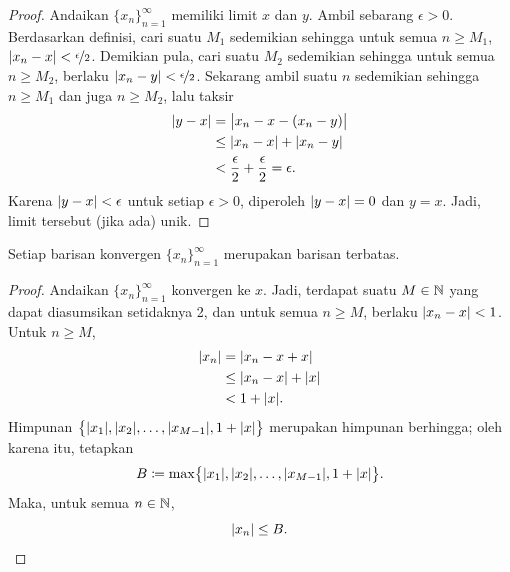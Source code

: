 \begin{proof}
Andaikan $\{ x_n \}_{n=1}^\infty$ memiliki limit $x$ dan $y$.
Ambil sebarang $\epsilon > 0$.
Berdasarkan definisi, cari suatu $M_1$ sedemikian sehingga untuk semua $n \geq M_1$,
$\lvert {x_n-x} \rvert < \nicefrac{\epsilon}{2}$.  Demikian pula, cari suatu $M_2$
sedemikian sehingga untuk semua $n \geq M_2$, berlaku
$\lvert {x_n-y} \rvert < \nicefrac{\epsilon}{2}$.
Sekarang ambil suatu $n$ sedemikian sehingga $n \geq M_1$ dan juga $n \geq M_2$, lalu taksir
\begin{equation*}
\begin{split}
\lvert {y-x} \rvert
& =
\bigl\lvert {x_n-x - (x_n -y)} \bigr\rvert \\
& \leq
\lvert {x_n-x} \rvert + \lvert {x_n -y} \rvert \\
& <
\frac{\epsilon}{2} + \frac{\epsilon}{2} = \epsilon .
\end{split}
\end{equation*}
Karena $\lvert {y-x} \rvert < \epsilon$ untuk setiap $\epsilon > 0$, diperoleh $\lvert {y-x} \rvert = 0$
dan $y=x$.  Jadi, limit tersebut (jika ada) unik.
\end{proof}

\begin{prop}
Setiap barisan konvergen $\{ x_n \}_{n=1}^\infty$ merupakan barisan terbatas.
\end{prop}

\begin{proof}
Andaikan $\{ x_n \}_{n=1}^\infty$ konvergen ke $x$.  Jadi, terdapat suatu $M \in {\mathbb{N}}$
yang dapat diasumsikan setidaknya 2, dan untuk semua $n \geq M$, berlaku
$\lvert {x_n - x} \rvert < 1$.  Untuk $n \geq M$,
\begin{equation*}
\begin{split}
\lvert {x_n} \rvert & = \lvert {x_n - x + x} \rvert
\\
& \leq \lvert {x_n - x} \rvert + \lvert {x} \rvert
\\
& < 1 + \lvert {x} \rvert .
\end{split}
\end{equation*}
Himpunan $\bigl\{ \lvert {x_1} \rvert, \lvert {x_2} \rvert, \ldots, \lvert {x_{M-1}} \rvert , 1+\lvert {x} \rvert \bigr\}$
merupakan himpunan berhingga; oleh karena itu, tetapkan
\begin{equation*}
B \coloneqq \max \bigl\{ \lvert {x_1} \rvert, \lvert {x_2} \rvert, \ldots, \lvert {x_{M-1}} \rvert, 1+\lvert {x} \rvert \bigr\} .
\end{equation*}
Maka, untuk semua $n \in {\mathbb{N}}$,
\begin{equation*}
\lvert {x_n} \rvert \leq B. \qedhere
\end{equation*}
\end{proof}

